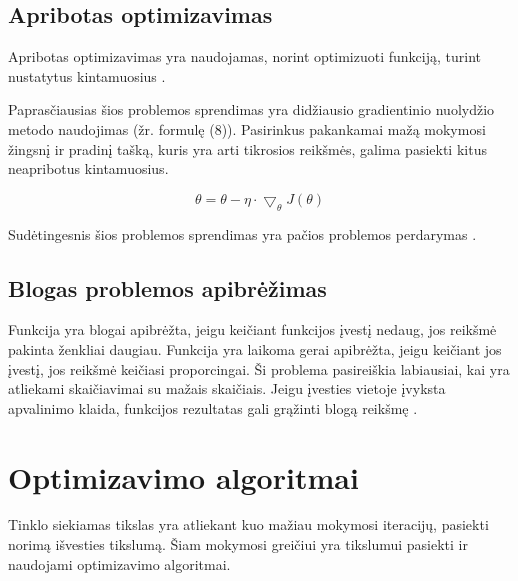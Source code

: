 \documentclass{VUMIFInfKursinis}
\begin{document}
\subsection{Apribotas optimizavimas}
Apribotas optimizavimas yra naudojamas, norint optimizuoti funkciją,
turint nustatytus kintamuosius \cite{salt7}.
\par
Paprasčiausias šios problemos sprendimas yra didžiausio gradientinio nuolydžio
metodo naudojimas (žr. formulę (8)). Pasirinkus pakankamai mažą mokymosi žingsnį ir pradinį tašką, kuris
yra arti tikrosios reikšmės, galima pasiekti kitus neapribotus kintamuosius.

\begin{equation}
\theta = \theta - \eta \cdot \bigtriangledown_{\theta}J(\theta)
\end{equation}

\par
Sudėtingesnis šios problemos sprendimas yra pačios problemos perdarymas \cite{salt7}.

\subsection{Blogas problemos apibrėžimas}

Funkcija yra blogai apibrėžta, jeigu keičiant funkcijos įvestį nedaug, jos reikšmė
pakinta ženkliai daugiau. Funkcija yra laikoma gerai apibrėžta, jeigu keičiant jos įvestį,
jos reikšmė keičiasi proporcingai. Ši problema pasireiškia labiausiai, kai yra
atliekami skaičiavimai su mažais skaičiais. Jeigu įvesties vietoje įvyksta apvalinimo
klaida, funkcijos rezultatas gali grąžinti blogą reikšmę \cite{salt7}.









\section{Optimizavimo algoritmai}
\par
Tinklo siekiamas tikslas yra atliekant kuo mažiau mokymosi iteracijų, pasiekti norimą
išvesties tikslumą. Šiam mokymosi greičiui yra tikslumui pasiekti ir naudojami
optimizavimo algoritmai.
\end{document}
